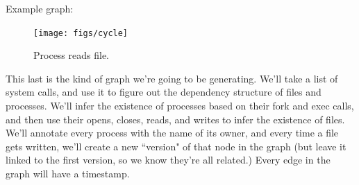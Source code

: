 \documentclass{article}
\begin{document}
Example graph:
\begin{figure}[h!]
  \centering
    \texttt{[image: figs/cycle]}
      \caption{Process reads file.}
      \label{fig:cycle}
\end{figure}

This last is the kind of graph we're going to be generating.  We'll take a list of system calls, and use it to figure out the dependency structure of files and processes. We'll infer the existence of processes based on their fork and exec calls, and then use their opens, closes, reads, and writes to infer the existence of files.  We'll annotate every process with the name of its owner, and every time a file gets written, we'll create a new ``version" of that node in the graph (but leave it linked to the first version, so we know they're all related.)  Every edge in the graph will have a timestamp.
\end{document}
